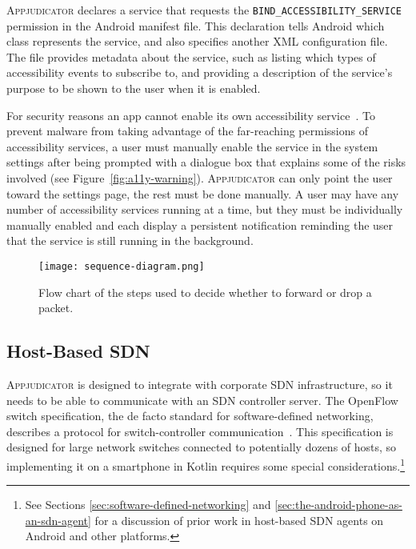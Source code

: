\textsc{Appjudicator} declares a service that requests the
\texttt{BIND\_ACCESSIBILITY\_SERVICE} permission in the Android manifest file.
This declaration tells Android which class represents the service, and also
specifies another XML configuration file. The file provides metadata about the
service, such as listing which types of accessibility events to subscribe to,
and providing a description of the service's purpose to be shown to the user
when it is enabled.

For security reasons an app cannot enable its own accessibility
service~\cite{kalysch2018}. To prevent malware from taking advantage of the
far-reaching permissions of accessibility services, a user must manually enable
the service in the system settings after being prompted with a dialogue box that
explains some of the risks involved (see Figure~\ref{fig:a11y-warning}).
\textsc{Appjudicator} can only point the user toward the settings page, the rest
must be done manually. A user may have any number of accessibility services
running at a time, but they must be individually manually enabled and each
display a persistent notification reminding the user that the service is still
running in the background.


\begin{figure}[p]
    \centering
    \texttt{[image: sequence-diagram.png]}
    \caption{Flow chart of the steps used to decide whether to forward or drop a
		packet.}
	\label{fig:packet-flow-chart}
\end{figure}


\subsection{Host-Based SDN}
\label{sec:host-based-sdn}

\textsc{Appjudicator} is designed to integrate with corporate SDN
infrastructure, so it needs to be able to communicate with an SDN controller
server. The OpenFlow switch specification, the de facto standard for
software-defined networking, describes a protocol for switch-controller
communication~\cite{openflowspec}. This specification is designed for large
network switches connected to potentially dozens of hosts, so implementing it on
a smartphone in Kotlin requires some special considerations.\footnote{See
Sections \ref{sec:software-defined-networking} and
\ref{sec:the-android-phone-as-an-sdn-agent} for a discussion of prior work in
host-based SDN agents on Android and other platforms.}

